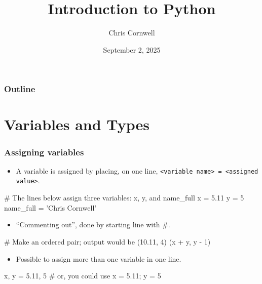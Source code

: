\documentclass{beamer}
\author{Chris Cornwell}
\date{September 2, 2025}
\title{Introduction to Python}
\newenvironment{codeblock}
    {\hfill\begin{beamerboxesrounded}[lower=codecol, width=0.8\textwidth]
    \medskip

    }
    { 
    \end{beamerboxesrounded}\hfill
    }
\theoremstyle{example}
\newcommand{\ttt}[1]{{\small\texttt{#1}}}
\begin{document}
\begin{frame}
\titlepage
\end{frame}

\begin{frame}
\frametitle{Outline}
\tableofcontents
\end{frame}

\section{Variables and Types}

\begin{frame}[fragile]
\frametitle{Assigning variables}

\begin{itemize}
	\item A variable is assigned by placing, on one line, \mbox{\ttt{<variable name> = <assigned value>}.}
\end{itemize}
\begin{codeblock}

\begin{python}
# The lines below assign three variables: x, y, and name_full
x = 5.11
y = 5
name_full = 'Chris Cornwell'
\end{python}

\end{codeblock}

\begin{itemize}
	\item ``Commenting out'', done by starting line with \#.
\end{itemize}

\begin{codeblock}

\begin{python}
# Make an ordered pair; output would be (10.11, 4)
(x + y, y - 1)
\end{python}

\end{codeblock}

\begin{itemize}
	\item Possible to assign more than one variable in one line.
\end{itemize}

\begin{codeblock}

\begin{python}
x, y = 5.11, 5
# or, you could use 
x = 5.11; y = 5
\end{python}

\end{codeblock}
\end{frame}
\end{document}
